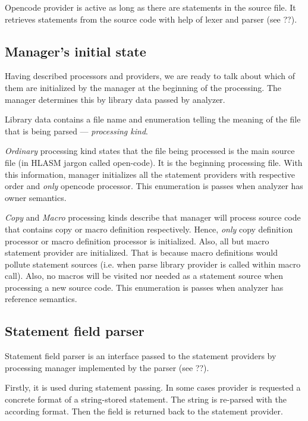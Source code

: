 Opencode provider is active as long as there are statements in the source file. It retrieves statements from the source code with help of lexer and parser (see ??).

\subsection{Manager's initial state}
\label{lab06:lib_data}
Having described processors and providers, we are ready to talk about which of them are initialized by the manager at the beginning of the processing. The manager determines this by library data passed by analyzer.

Library data contains a file name and enumeration telling the meaning of the file that is being parsed --- \emph{processing kind}.

\emph{Ordinary} processing kind states that the file being processed is the main source file (in HLASM jargon called open-code). It is the beginning processing file. With this information, manager initializes all the statement providers with respective order and \emph{only} opencode processor. This enumeration is passes when analyzer has owner semantics.

\emph{Copy} and \emph{Macro} processing kinds describe that manager will process source code that contains copy or macro definition respectively. Hence, \emph{only} copy  definition processor or macro definition processor is initialized. Also, all but macro statement provider are initialized. That is because macro definitions would pollute statement sources (i.e. when parse library provider is called within macro call). Also, no macros will be visited nor needed as a statement source when processing a new source code. This enumeration is passes when analyzer has reference semantics.


\subsection{Statement field parser}
\label{lab06:field_parser}

Statement field parser is an interface passed to the statement providers by processing manager implemented by the parser (see ??).

Firstly, it is used during statement passing. In some cases provider is requested a concrete format of a string-stored statement. The string is re-parsed with the according format. Then the field is returned back to the statement provider. 

